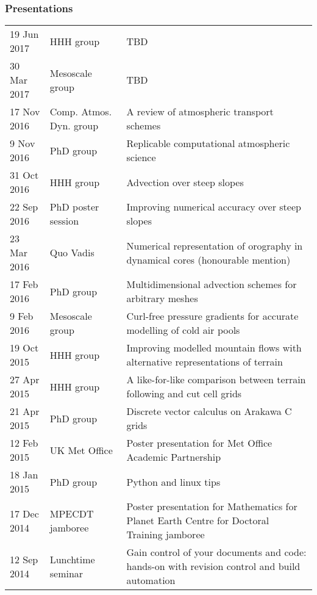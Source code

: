 \documentclass[a4paper,11pt]{article}
\begin{document}
\subsubsection*{Presentations}
\begin{tabularx}{\linewidth}{l l X}
19 Jun 2017 & HHH group & TBD \\
30 Mar 2017 & Mesoscale group & TBD \\
17 Nov 2016 & Comp. Atmos. Dyn. group & A review of atmospheric transport schemes \\
9 Nov 2016 & PhD group & Replicable computational atmospheric science \\
31 Oct 2016 & HHH group & Advection over steep slopes \\
22 Sep 2016 & PhD poster session & Improving numerical accuracy over steep slopes \\
23 Mar 2016 & Quo Vadis & Numerical representation of orography in dynamical cores (honourable mention) \\
17 Feb 2016 & PhD group & Multidimensional advection schemes for arbitrary meshes \\
9 Feb 2016 & Mesoscale group & Curl-free pressure gradients for accurate modelling of cold air pools \\
19 Oct 2015 & HHH group & Improving modelled mountain flows with alternative representations of terrain \\
27 Apr 2015 & HHH group & A like-for-like comparison between terrain following and cut cell grids \\
21 Apr 2015 & PhD group & Discrete vector calculus on Arakawa C grids \\
12 Feb 2015 & UK Met Office & Poster presentation for Met Office Academic Partnership \\
18 Jan 2015 & PhD group & Python and linux tips \\
17 Dec 2014 & MPECDT jamboree & Poster presentation for Mathematics for Planet Earth Centre for Doctoral Training jamboree \\
12 Sep 2014 & Lunchtime seminar  & Gain control of your documents and code: hands-on with revision control and build automation \\
\end{tabularx}
\end{document}
